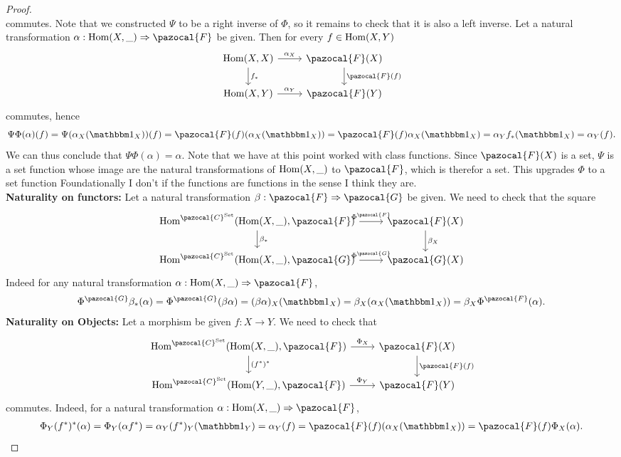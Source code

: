 \begin{proof}
$$    $$
    commutes. Note that we constructed $\Psi$ to be a right inverse of $\Phi$, so it remains to check that it is also a left inverse. Let a natural transformation $\alpha: \Hom(X,\_)\Rightarrow \pazocal{F}$ be given. Then for every $f\in \mathrm{Hom}(X,Y)$
    $$
        \begin{tikzcd} 
            \Hom(X,X) \arrow[r,"\alpha_X"] \arrow[d,"f_\ast"] & \pazocal{F}(X) \arrow[d,"\pazocal{F}(f)"]\\
            \Hom(X,Y) \arrow[r, "\alpha_Y"] & \pazocal{F}(Y)
        \end{tikzcd}
    $$ 
    commutes, hence 
    $$
        \Psi\Phi(\alpha)(f)= \Psi(\alpha_X(\fone_X))(f) = \pazocal{F}(f)(\alpha_X(\fone_X)) = \pazocal{F}(f)\alpha_X(\fone_X)=\alpha_Y f_\ast(\fone_X)=\alpha_Y(f).
    $$
    We can thus conclude that $\Psi\Phi(\alpha)=\alpha$. Note that we have at this point worked with class functions. Since $\pazocal{F}(X)$ is a set, $\Psi$ is a set function whose image are the natural transformations of $\mathrm{Hom}(X,\_)$ to $\pazocal{F}$, which is therefor a set. This upgrades $\Phi$ to a set function {Foundationally I don't if the functions are functions in the sense I think they are}.\\
    \textbf{Naturality on functors:} Let a natural transformation $\beta : \pazocal{F}\Rightarrow \pazocal{G}$ be given. We need to check that the square
    $$
        \begin{tikzcd}
            \Hom^{\pazocal{C}^\mathrm{Set}}(\Hom(X,\_),\pazocal{F}) \arrow[r,"\Phi^\pazocal{F}"]\arrow[d,"\beta_\ast"] & \pazocal{F}(X)\arrow[d,"\beta_X"]\\
            \Hom^{\pazocal{C}^\mathrm{Set}}(\Hom(X,\_),\pazocal{G}) \arrow[r,"\Phi^\pazocal{G}"] & \pazocal{G}(X)
        \end{tikzcd}
    $$
    Indeed for any natural transformation $\alpha : \Hom(X,\_)\Rightarrow \pazocal{F}$,
    \begin{align*}
        \Phi^\pazocal{G}\beta_\ast(\alpha) = \Phi^\pazocal{G}(\beta\alpha) = (\beta\alpha)_X(\fone_X)= \beta_X(\alpha_X(\fone_X))= \beta_X\Phi^\pazocal{F}(\alpha).
    \end{align*}
    \textbf{Naturality on Objects:} Let a morphism be given $f:X\rightarrow Y$. We need to check that 
    $$
        \begin{tikzcd}
            \Hom^{\pazocal{C}^\mathrm{Set}}(\Hom(X,\_),\pazocal{F}) \arrow[r,"\Phi_X"]\arrow[d,"(f^\ast)^\ast"] & \pazocal{F}(X)\arrow[d,"\pazocal{F}(f)"]\\
            \Hom^{\pazocal{C}^\mathrm{Set}}(\Hom(Y,\_),\pazocal{F}) \arrow[r,"\Phi_Y"] & \pazocal{F}(Y)
        \end{tikzcd}
    $$
    commutes. Indeed, for a natural transformation $\alpha: \Hom(X,\_)\Rightarrow \pazocal{F}$, 
    \begin{align*}
        \Phi_Y(f^\ast)^\ast(\alpha)= \Phi_Y(\alpha f^\ast) = \alpha_Y (f^\ast)_Y(\fone_Y) = \alpha_Y(f) = \pazocal{F}(f)(\alpha_X(\fone_X))= \pazocal{F}(f)\Phi_X(\alpha).
    \end{align*}
\end{proof}

